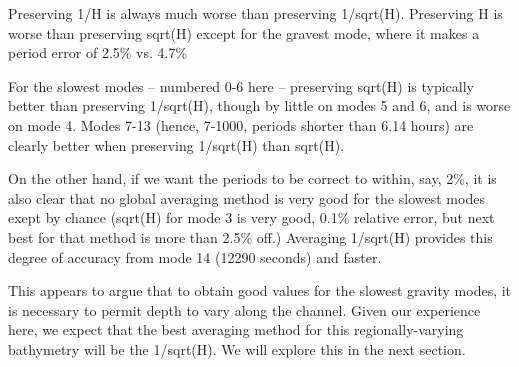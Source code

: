   Preserving 1/H is always much worse than preserving 1/sqrt(H).
Preserving H is worse than preserving sqrt(H) except for the gravest
mode, where it makes a period error of 2.5\% vs. 4.7\%

  For the slowest modes -- numbered 0-6 here -- preserving sqrt(H)
is typically better than preserving 1/sqrt(H), though by little
on modes 5 and 6, and is worse on mode 4.  Modes 7-13 (hence, 7-1000,
periods shorter than 6.14 hours) are clearly better when preserving 
1/sqrt(H) than sqrt(H).

  On the other hand, if we want the periods to be correct to within,
say, 2\%, it is also clear that no global averaging method is very 
good for the slowest modes exept by chance (sqrt(H) for mode 3 is
very good, 0.1\% relative error, but next best for that method 
is more than 2.5\% off.)  Averaging 1/sqrt(H) provides this degree of
accuracy from mode 14 (12290 seconds) and faster.

  This appears to argue that to obtain good values for the slowest 
gravity modes, it is necessary to permit depth to vary along the
channel.  Given our experience here, we expect that the best averaging
method for this regionally-varying bathymetry will be the 1/sqrt(H). 
We will explore this in the next section.

